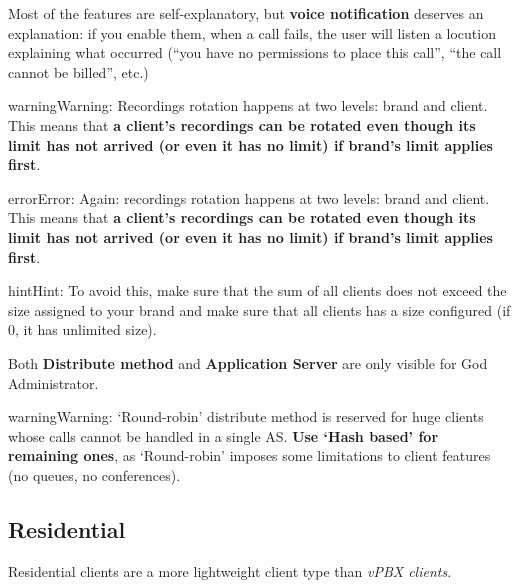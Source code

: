 \documentclass[letterpaper,10pt,english]{sphinxmanual}
\begin{document}
Most of the features are self-explanatory, but \textbf{voice notification} deserves
an explanation: if you enable them, when a call fails, the user will listen a
locution explaining what occurred (``you have no permissions to place this call'',
``the call cannot be billed'', etc.)

\begin{notice}{warning}{Warning:}
Recordings rotation happens at two levels: brand and client. This
means that \textbf{a client's recordings can be rotated even though its limit
has not arrived (or even it has no limit) if brand's limit applies first}.
\end{notice}

\begin{notice}{error}{Error:}
Again: recordings rotation happens at two levels: brand and client. This
means that \textbf{a client's recordings can be rotated even though its limit
has not arrived (or even it has no limit) if brand's limit applies first}.
\end{notice}

\begin{notice}{hint}{Hint:}
To avoid this, make sure that the sum of all clients does not exceed
the size assigned to your brand and make sure that all clients has
a size configured (if 0, it has unlimited size).
\end{notice}

Both \textbf{Distribute method} and \textbf{Application Server} are only visible for God
Administrator.

\begin{notice}{warning}{Warning:}
`Round-robin' distribute method is reserved for huge clients
whose calls cannot be handled in a single AS. \textbf{Use `Hash based'
for remaining ones}, as `Round-robin' imposes some limitations
to client features (no queues, no conferences).
\end{notice}


\subsection{Residential}
\label{administration_portal/brand/clients/residential:residential}\label{administration_portal/brand/clients/residential::doc}
Residential clients are a more lightweight client type than \emph{vPBX clients}.
\end{document}
